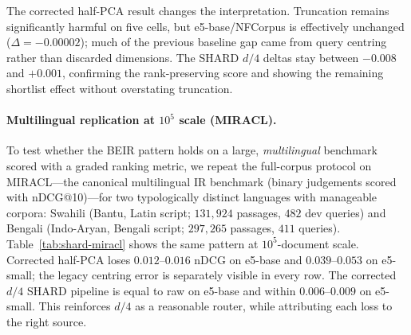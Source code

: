 \noindent
The corrected half-PCA result changes the interpretation. Truncation remains
significantly harmful on five cells, but e5-base/NFCorpus is effectively
unchanged ($\Delta=-0.00002$); much of the previous baseline gap came from
query centring rather than discarded dimensions. The SHARD $d/4$ deltas stay
between $-0.008$ and $+0.001$, confirming the rank-preserving score and
showing the remaining shortlist effect without overstating truncation.

\paragraph{Multilingual replication at $10^5$ scale (MIRACL).}
To test whether the BEIR pattern holds on a large, \emph{multilingual}
benchmark scored with a graded ranking metric, we repeat the full-corpus
protocol on MIRACL---the canonical multilingual IR benchmark (binary
judgements scored with nDCG@10)---for two typologically distinct languages
with manageable corpora: Swahili (Bantu, Latin script; $131{,}924$ passages,
$482$ dev queries) and Bengali (Indo-Aryan, Bengali script; $297{,}265$
passages, $411$ queries). Table~\ref{tab:shard-miracl} shows the same
pattern at $10^5$-document scale. Corrected half-PCA loses $0.012$--$0.016$
nDCG on e5-base and $0.039$--$0.053$ on e5-small; the legacy centring error
is separately visible in every row. The corrected $d/4$ SHARD pipeline is
equal to raw on e5-base and within $0.006$--$0.009$ on e5-small. This
reinforces $d/4$ as a reasonable router, while attributing each loss to the
right source.

